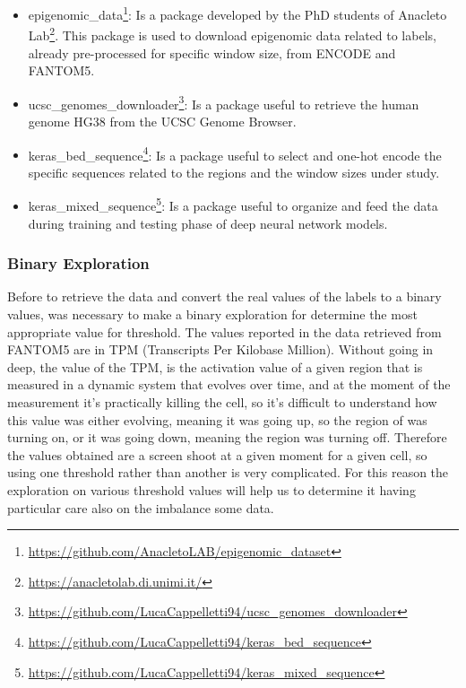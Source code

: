 \documentclass{article}
\begin{document}
\begin{itemize}
    \item epigenomic\_data\footnote{\url{https://github.com/AnacletoLAB/epigenomic_dataset}}: Is a package developed by the PhD students of Anacleto Lab\footnote{\url{https://anacletolab.di.unimi.it/}}. This package is used to download epigenomic data related to labels, already pre-processed for specific window size, from ENCODE and FANTOM5.
    \item ucsc\_genomes\_downloader\footnote{\url{https://github.com/LucaCappelletti94/ucsc_genomes_downloader}}: Is a package useful to retrieve the human genome HG38 from the \acrshort{UCSC} Genome Browser.
    \item keras\_bed\_sequence\footnote{\url{https://github.com/LucaCappelletti94/keras_bed_sequence}}: Is a package useful to select and one-hot encode the specific sequences related to the regions and the window sizes under study.
    \item keras\_mixed\_sequence\footnote{\url{https://github.com/LucaCappelletti94/keras_mixed_sequence}}: Is a package useful to organize and feed the data during training and testing phase of deep neural network models.
\end{itemize}

\subsubsection{Binary Exploration}
\label{subsec:Binary_Exploration}
Before to retrieve the data and convert the real values of the labels to a binary values, was necessary to make a binary exploration for determine the most appropriate value for threshold. The values reported in the data retrieved from FANTOM5 are in \acrshort{TPM} (Transcripts Per Kilobase Million). Without going in deep, the value of the \acrshort{TPM}, is the activation value of a given region that is measured in a dynamic system that evolves over time, and at the moment of the measurement it's practically killing the cell, so it's difficult to understand how this value was either evolving, meaning it was going up, so the region of was turning on, or it was going down, meaning the region was turning off. Therefore the values obtained are a screen shoot at a given moment for a given cell, so using one threshold rather than another is very complicated. For this reason the exploration on various threshold values will help us to determine it having particular care also on the imbalance some data.
\end{document}
